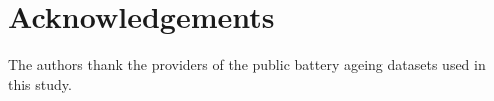 \documentclass[a4paper,fleqn]{cas-sc}
\begin{document}

\section*{Acknowledgements}

The authors thank the providers of the public battery ageing datasets used in
this study.




\end{document}
